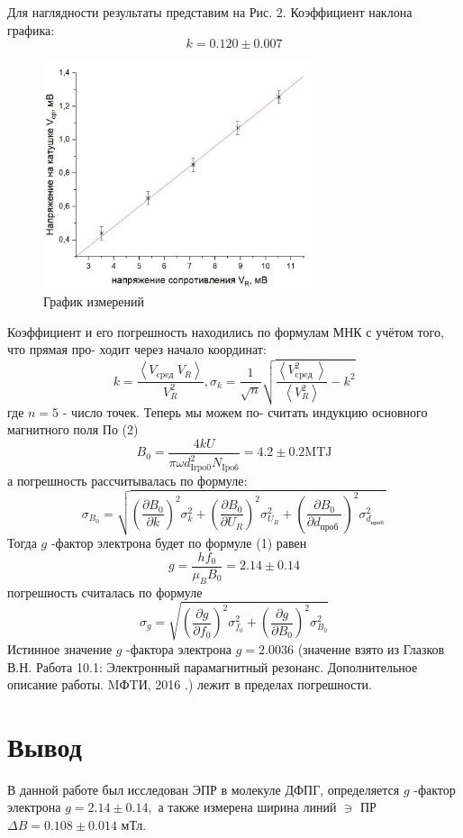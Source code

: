 \documentclass[a4paper, 12pt]{article}%
\begin{document}
Для наглядности результаты представим на Рис. $2 .$ Коэффициент наклона графика:
$$
k=0.120 \pm 0.007
$$
\begin{figure}[h]
\begin{center}
\includegraphics[width = 0.7\textwidth]{4.jpg}
\caption{График измерений}
\end{center}
\end{figure}
Коэффициент и его погрешность находились по формулам МНК с учётом того, что прямая про-
ходит через начало координат:
$$
k=\frac{\left\langle V_{\text {cpeд }} V_{R}\right\rangle}{V_{R}^{2}}, \sigma_{k}=\frac{1}{\sqrt{n}} \sqrt{\frac{\left\langle V_{\text {cpeд }}^{2}\right\rangle}{\left\langle V_{R}^{2}\right\rangle}-k^{2}}
$$
где $n=5$ - число точек. Теперь мы можем по-
считать индукцию основного магнитного поля По (2)
$$
B_{0}=\frac{4 k U}{\pi \omega d_{\mathrm{Irpo} 0}^{2} N_{\mathrm{Ipo} 6}}=4.2 \pm 0.2 \mathrm{MTJ}
$$
а погрешность рассчитывалась по формуле:
$$
\sigma_{B_{0}}=\sqrt{\left(\frac{\partial B_{0}}{\partial k}\right)^{2} \sigma_{k}^{2}+\left(\frac{\partial B_{0}}{\partial U_{R}}\right)^{2} \sigma_{U_{R}}^{2}+\left(\frac{\partial B_{0}}{\partial d_{\text {проб }}}\right)^{2} \sigma_{d_{\text {проб }}}^{2}}
$$
Тогда $g$ -фактор электрона будет по формуле (1) равен
$$
g=\frac{h f_{0}}{\mu_{B} B_{0}}=2.14 \pm 0.14
$$
погрешность считалась по формуле
$$
\sigma_{g}=\sqrt{\left(\frac{\partial g}{\partial f_{0}}\right)^{2} \sigma_{f_{0}}^{2}+\left(\frac{\partial g}{\partial B_{0}}\right)^{2} \sigma_{B_{0}}^{2}}
$$
Истинное значение $g$ -фактора электрона $g=2.0036$ (значение взято из Глазков В.Н. Работа 10.1: Электронный парамагнитный резонанс. Дополнительное описание работы. MФTИ, 2016 .) лежит в пределах погрешности.
\section*{Вывод}
В данной работе был исследован ЭПР в молекуле ДФПГ, определяется $g$ -фактор электрона $g=2.14 \pm 0.14,$ а также измерена ширина линий $\ni$ ПР $\Delta B=0.108 \pm 0.014$ мТл.
\end{document}
